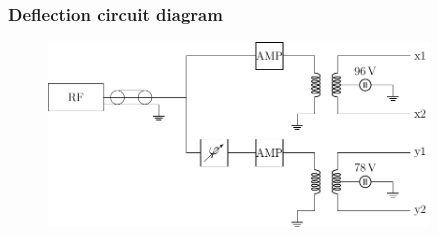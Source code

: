\documentclass[aspectratio=169]{beamer}
\begin{document}
\begin{frame}
	\frametitle{Deflection circuit diagram}
	\begin{figure}[ht]
		\centering
		\includegraphics[width=0.9\textwidth]{../Figures/Thesis-figure3.pdf}
	\end{figure}
\end{frame}

\end{document}
